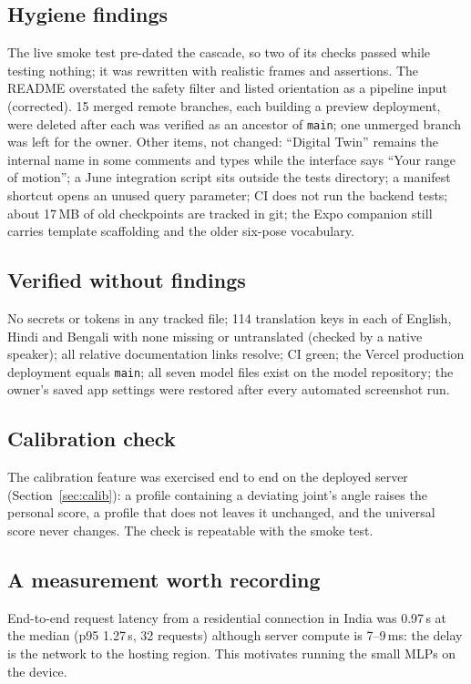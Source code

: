 \subsection{Hygiene findings}
The live smoke test pre-dated the cascade, so two of its checks passed while testing nothing; it was rewritten with realistic frames and assertions. The README overstated the safety filter and listed orientation as a pipeline input (corrected). 15 merged remote branches, each building a preview deployment, were deleted after each was verified as an ancestor of \texttt{main}; one unmerged branch was left for the owner. Other items, not changed: ``Digital Twin'' remains the internal name in some comments and types while the interface says ``Your range of motion''; a June integration script sits outside the tests directory; a manifest shortcut opens an unused query parameter; CI does not run the backend tests; about 17\,MB of old checkpoints are tracked in git; the Expo companion still carries template scaffolding and the older six-pose vocabulary.

\subsection{Verified without findings}
No secrets or tokens in any tracked file; 114 translation keys in each of English, Hindi and Bengali with none missing or untranslated (checked by a native speaker); all relative documentation links resolve; CI green; the Vercel production deployment equals \texttt{main}; all seven model files exist on the model repository; the owner's saved app settings were restored after every automated screenshot run.

\subsection{Calibration check}
The calibration feature was exercised end to end on the deployed server (Section~\ref{sec:calib}): a profile containing a deviating joint's angle raises the personal score, a profile that does not leaves it unchanged, and the universal score never changes. The check is repeatable with the smoke test.

\subsection{A measurement worth recording}
End-to-end request latency from a residential connection in India was 0.97\,s at the median (p95 1.27\,s, 32 requests) although server compute is 7--9\,ms: the delay is the network to the hosting region. This motivates running the small MLPs on the device.
